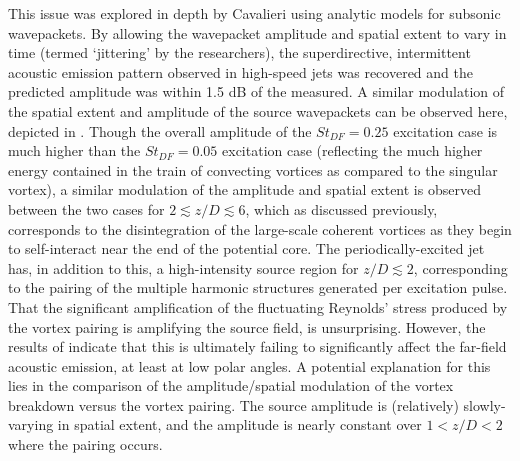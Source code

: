 This issue was explored in depth by Cavalieri \etal \citep{Cavalieri2010} using analytic models for subsonic wavepackets.
By allowing the wavepacket amplitude and spatial extent to vary in time (termed `jittering' by the researchers), the superdirective, intermittent acoustic emission pattern observed in high-speed jets was recovered and the predicted amplitude was within 1.5 dB of the measured.
A similar modulation of the spatial extent and amplitude of the source wavepackets can be observed here, depicted in .
Though the overall amplitude of the $St_{DF} = 0.25$ excitation case is much higher than the $St_{DF} = 0.05$ excitation case (reflecting the much higher energy contained in the train of convecting vortices as compared to the singular vortex), a similar modulation of the amplitude and spatial extent is observed between the two cases for $ 2 \lesssim z/D \lesssim 6$, which as discussed previously, corresponds to the disintegration of the large-scale coherent vortices as they begin to self-interact near the end of the potential core.
The periodically-excited jet has, in addition to this, a high-intensity source region  for $z/D \lesssim 2$, corresponding to the pairing of the multiple harmonic structures generated per excitation pulse.
That the significant amplification of the fluctuating Reynolds' stress produced by the vortex pairing is amplifying the source field, is unsurprising.
However, the results of  indicate that this is ultimately failing to significantly affect the far-field acoustic emission, at least at low polar angles.
A potential explanation for this lies in the comparison of the amplitude/spatial modulation of the vortex breakdown versus the vortex pairing.
The source amplitude is (relatively) slowly-varying in spatial extent, and the amplitude is nearly constant over $1 < z/D < 2$ where the pairing occurs.
